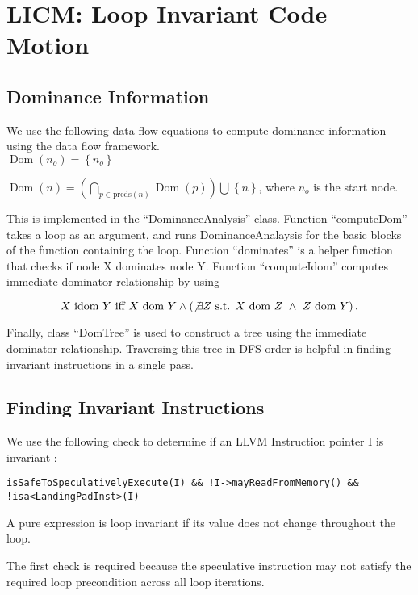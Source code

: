 \section{LICM: Loop Invariant Code Motion}

\subsection{Dominance Information}

We use the following data flow equations to compute dominance information using the
data flow framework. \\

$\operatorname{Dom}(n_o) = \left \{ n_o \right \}$

$\operatorname{Dom}(n) = \left ( \bigcap_{p \in \text{preds}(n)}^{} \operatorname{Dom}(p) \right ) \bigcup^{} \left \{ n \right \}$,
where $n_o$ is the start node.

This is implemented in the ``DominanceAnalysis'' class. Function ``computeDom'' takes a loop as an argument, and runs DominanceAnalaysis for the basic blocks of the function containing the loop. Function ``dominates'' is a helper function that checks if node X dominates node Y. Function ``computeIdom'' computes immediate dominator relationship by using

$$
X \text{ idom } Y \text{ iff } X \text{ dom } Y \land \left(\not\exists Z \text { s.t. } X \text{ dom } Z\ \land\ Z \text{ dom } Y\right).
$$

Finally, class ``DomTree'' is used to construct a tree using the immediate dominator relationship. Traversing this tree in DFS order is helpful in finding invariant instructions in a single pass.

\subsection{Finding Invariant Instructions}

We use the following check to determine if an LLVM Instruction pointer I is invariant :

\texttt{isSafeToSpeculativelyExecute(I) \&\& !I->mayReadFromMemory() \&\& !isa<LandingPadInst>(I)}

A pure expression is loop invariant if its value does not change throughout the loop. 

The first check is required because the speculative instruction may not satisfy the required loop precondition across all loop iterations.

